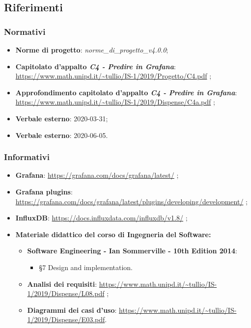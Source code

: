 \subsection{Riferimenti}
		\subsubsection{Normativi}
			\begin{itemize}
				\item \textbf{Norme di progetto}: \emph{norme\_di\_progetto\_v4.0.0};
				\item \textbf{Capitolato d'appalto \emph{C4 - Predire in Grafana}}: \url{https://www.math.unipd.it/~tullio/IS-1/2019/Progetto/C4.pdf} ;
				\item \textbf{Approfondimento capitolato d'appalto \emph{C4 - Predire in Grafana}}: \url{https://www.math.unipd.it/~tullio/IS-1/2019/Dispense/C4a.pdf} ;
				\item \textbf{Verbale esterno}: 2020-03-31;
				\item \textbf{Verbale esterno}: 2020-06-05.
			\end{itemize}
		
		\subsubsection{Informativi}
			\begin{itemize}
			\item \textbf{Grafana}: \url{https://grafana.com/docs/grafana/latest/} ;
			\item \textbf{Grafana plugins}: \url{https://grafana.com/docs/grafana/latest/plugins/developing/development/} ;
			\item \textbf{InfluxDB}: \url{https://docs.influxdata.com/influxdb/v1.8/} ;

			\item \textbf{Materiale didattico del corso di Ingegneria del Software:}
			\begin{itemize}
				\item \textbf{Software Engineering - Ian Sommerville - 10th Edition 2014}: \begin{itemize}
				\item \S 7 Design and implementation.
				\end{itemize}
				\item \textbf{Analisi dei requisiti}: \url{https://www.math.unipd.it/~tullio/IS-1/2019/Dispense/L08.pdf} ;				\item \textbf{Diagrammi dei casi d'uso}: \url{https://www.math.unipd.it/~tullio/IS-1/2019/Dispense/E03.pdf}.
					
				\end{itemize}
			\end{itemize}				